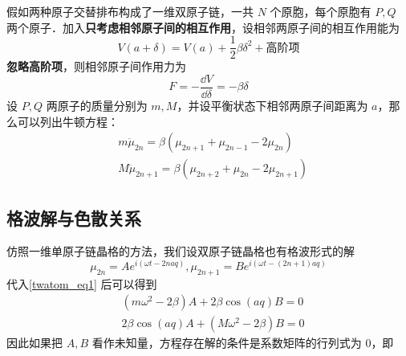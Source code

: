 
假如两种原子交替排布构成了一维双原子链，一共 $N$ 个原胞，每个原胞有 $P,Q$ 两个原子．加入\textbf{只考虑相邻原子间的相互作用}，设相邻两原子间的相互作用能为
\begin{equation}
V(a+\delta)=V(a)+\frac{1}{2}\beta \delta^2+\text{高阶项}
\end{equation}
\textbf{忽略高阶项}，则相邻原子间作用力为
\begin{equation}
F=-\frac{\dd V}{\dd \delta}=-\beta \delta
\end{equation}
设 $P,Q$ 两原子的质量分别为 $m,M$，并设平衡状态下相邻两原子间距离为 $a$，那么可以列出牛顿方程：
\begin{equation}\label{twatom_eq1}
\begin{aligned}
&m\ddot \mu_{2n}=\beta(\mu_{2n+1}+\mu_{2n-1}-2\mu_{2n})\\
&M\ddot \mu_{2n+1}=\beta(\mu_{2n+2}+\mu_{2n}-2\mu_{2n+1})
\end{aligned}
\end{equation}
\subsection{格波解与色散关系}
仿照一维单原子链晶格的方法，我们设双原子链晶格也有格波形式的解
\begin{equation}
\mu_{2n}=A e^{i(\omega t - 2naq)},\mu_{2n+1}=B  e^{i(\omega t - (2n+1)aq)}
\end{equation}
代入\autoref{twatom_eq1} 后可以得到
\begin{equation}
\begin{aligned}
&(m\omega^2-2\beta)A+2\beta\cos(aq)B=0\\
&2\beta\cos(aq)A+(M\omega^2-2\beta)B=0
\end{aligned}
\end{equation}
因此如果把 $A,B$ 看作未知量，方程存在解的条件是系数矩阵的行列式为 $0$，即